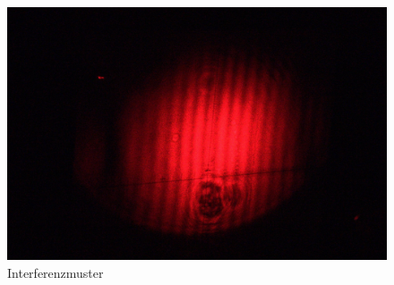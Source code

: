 \begin{figure}[ht]
 \includegraphics[width=\textwidth]{Photos/IMG_3887.jpg}
 \caption{Interferenzmuster}
\end{figure}